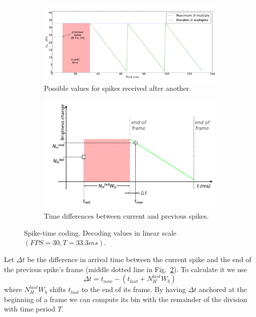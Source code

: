 \documentclass[conference]{IEEEtran}
\begin{document}
\begin{figure}[htb]
  
  \centering
  
  \begin{subfigure}[b]{0.45\textwidth}
    \includegraphics[width=\textwidth]{spike_values_linear}
    \caption{Possible values for spikes received after another.}
    \label{fig:linear_time_all}
  \end{subfigure}
  
  \begin{subfigure}[b]{0.45\textwidth}
    \includegraphics[width=\textwidth]{new_val_calc_linear}
    \caption{Time differences between current and previous spikes.}
    \label{fig:linear_time_calc}
  \end{subfigure}
  \caption{Spike-time coding. Decoding values in linear scale $(FPS=30,T=33.3ms)$.}
  \label{fig:linear_time}
\end{figure} 


Let $\Delta t$ be the difference in arrival time between the current spike and the end of the previous spike's frame (middle dotted line in  Fig.~\ref{fig:linear_time_calc}). To calculate it we use
\begin{equation}
\Delta t = t_{now} -  \left(t_{last} + N_{H}^{last}W_{b}\right)
\label{eq:time_diff}
\end{equation}
where $N_{H}^{last}W_{b}$ shifts $t_{last}$ to the end of its frame. By having $\Delta t$ anchored at the beginning of a frame we can compute its bin with the remainder of the division with time period $T$.
\end{document}
